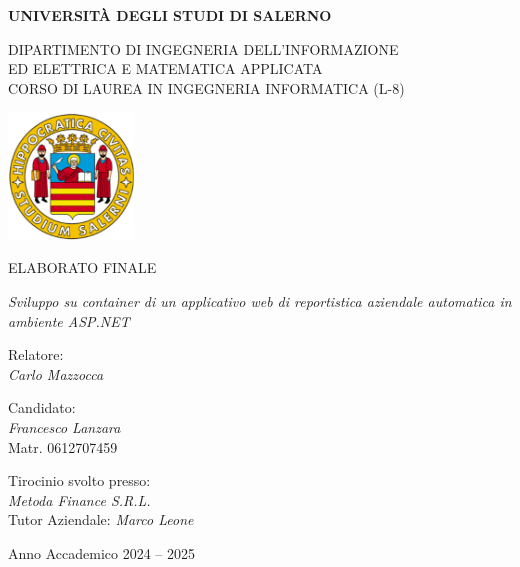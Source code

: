 

\begin{center}
		\textbf{\Large{UNIVERSITÀ DEGLI STUDI DI SALERNO}}

	\vspace{0.5cm}
	\large DIPARTIMENTO DI INGEGNERIA DELL'INFORMAZIONE \\
	ED ELETTRICA E MATEMATICA APPLICATA \\
	\vspace{0.2cm}
	CORSO DI LAUREA IN INGEGNERIA INFORMATICA (L-8)
	\vspace{1cm}

	\includegraphics[width=0.25\textwidth]{fig/Logo_Unisa.png}
	\vspace{1cm}

	\large ELABORATO FINALE
	\vspace{0.5cm}

	\emph{\LARGE Sviluppo su container di un applicativo web di reportistica aziendale automatica in ambiente ASP.NET}
	\vspace{1.5cm}
\end{center}

\noindent
\begin{minipage}[t]{0.45\textwidth}
	Relatore: \\
	\emph{Carlo Mazzocca}
\end{minipage}
\hfill
\begin{minipage}[t]{0.45\textwidth}
	Candidato: \\
	\emph{Francesco Lanzara} \\
	Matr. 0612707459
\end{minipage}

\vspace{0.8cm}
\noindent
Tirocinio svolto presso: \\
\emph{Metoda Finance S.R.L.} \\
Tutor Aziendale: \emph{Marco Leone}

\vspace{3,5cm}
\begin{center}
	Anno Accademico 2024 -- 2025
\end{center}